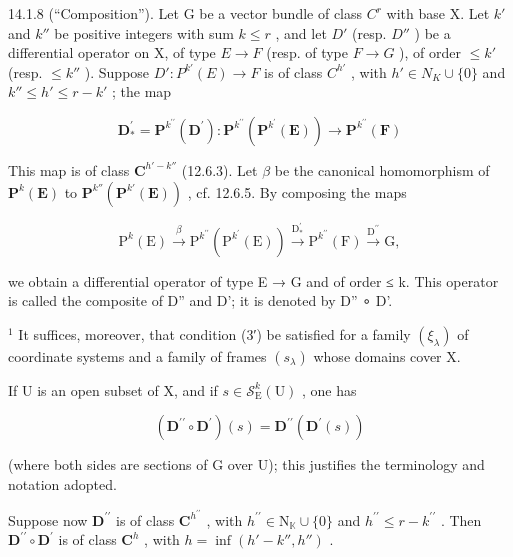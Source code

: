 14.1.8 (“Composition”). Let G be a vector bundle of class \(C^{r}\) with base X. Let \(k'\) and \(k''\) be positive integers with sum \(k \leqslant r\) , and let \(D'\) (resp. \(D''\) ) be a differential operator on X, of type \(E \to F\) (resp. of type \(F \to G\) ), of order \(\leqslant k'\) (resp. \(\leqslant k''\) ). Suppose \(D': P^{k'}(E) \to F\) is of class \(C^{h'}\) , with \(h' \in N_{K} \cup \{0\}\) and \(k'' \leqslant h' \leqslant r - k'\) ; the map

\[
\mathbf {D} _ {*} ^ {\prime} = \mathbf {P} ^ {k ^ {\prime \prime}} (\mathbf {D} ^ {\prime}) \colon \mathbf {P} ^ {k ^ {\prime \prime}} (\mathbf {P} ^ {k ^ {\prime}} (\mathbf {E})) \rightarrow \mathbf {P} ^ {k ^ {\prime \prime}} (\mathbf {F})
\]

This map is of class \(\mathbf{C}^{h'-k''}\) (12.6.3). Let \(\beta\) be the canonical homomorphism of \(\mathbf{P}^{k}(\mathbf{E})\) to \(\mathbf{P}^{k''}(\mathbf{P}^{k'}(\mathbf{E}))\) , cf. 12.6.5. By composing the maps

\[
\mathrm{P} ^ {k} (\mathrm{E}) \xrightarrow {\beta} \mathrm{P} ^ {k ^ {\prime \prime}} (\mathrm{P} ^ {k ^ {\prime}} (\mathrm{E})) \xrightarrow {\mathrm{D} _ {*} ^ {\prime}} \mathrm{P} ^ {k ^ {\prime \prime}} (\mathrm{F}) \xrightarrow {\mathrm{D} ^ {\prime \prime}} \mathrm{G},
\]

we obtain a differential operator of type E → G and of order ≤ k. This operator is called the composite of D'' and D'; it is denoted by D'' ∘ D'.

\(^{1}\) It suffices, moreover, that condition (3′) be satisfied for a family \((\xi_{\lambda})\) of coordinate systems and a family of frames \((s_{\lambda})\) whose domains cover X.

If U is an open subset of X, and if \(s \in \mathcal{S}_{\mathrm{E}}^{k}(\mathrm{U})\) , one has

\[
(\mathbf {D} ^ {\prime \prime} \circ \mathbf {D} ^ {\prime}) (s) = \mathbf {D} ^ {\prime \prime} (\mathbf {D} ^ {\prime} (s))
\]

(where both sides are sections of G over U); this justifies the terminology and notation adopted.

Suppose now \(\mathbf{D}^{\prime \prime}\) is of class \(\mathbf{C}^{h^{\prime \prime}}\) , with \(h^{\prime \prime} \in \mathrm{N}_{\mathbb{K}} \cup \{0\}\) and \(h^{\prime \prime} \leqslant r-k^{\prime\prime}\) . Then \(\mathbf{D}^{\prime \prime} \circ \mathbf{D}^{\prime}\) is of class \(\mathbf{C}^{h}\) , with \(h=\inf(h'-k'',h'')\) .


